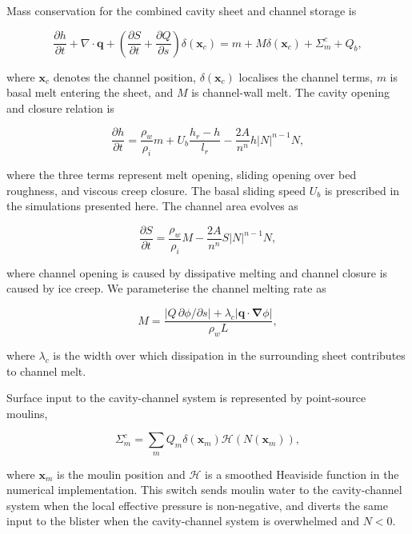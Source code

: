 \documentclass[draft]{agujournal2019}
\newcommand{\Grad}{\boldsymbol{\nabla}}
\newcommand{\pdiff}[2]{\frac{\partial{#1}}{\partial{#2}}}
\begin{document}
Mass conservation for the combined cavity sheet and channel storage is
\begin{linenomath*}
\begin{equation}\label{eq:mass_conservation}
    \pdiff{h}{t}
    + \nabla \cdot \boldsymbol{q}
    + \left(\pdiff{S}{t}+\pdiff{Q}{s}\right)\delta(\boldsymbol{x}_c)
    = m + M\delta(\boldsymbol{x}_c) + \Sigma_m^{c} + Q_b,
\end{equation}
\end{linenomath*}
where $\boldsymbol{x}_c$ denotes the channel position, $\delta(\boldsymbol{x}_c)$ localises the channel terms, $m$ is basal melt entering the sheet, and $M$ is channel-wall melt. The cavity opening and closure relation is
\begin{linenomath*}
\begin{equation}\label{eq:cavity_evolution}
    \pdiff{h}{t}
    =
    \frac{\rho_w}{\rho_i}m
    + U_b\frac{h_r-h}{l_r}
    - \frac{2A}{n^n}h|N|^{n-1}N,
\end{equation}
\end{linenomath*}
where the three terms represent melt opening, sliding opening over bed roughness, and viscous creep closure. The basal sliding speed $U_b$ is prescribed in the simulations presented here. The channel area evolves as
\begin{linenomath*}
\begin{equation}\label{eq:channel_evolution}
    \pdiff{S}{t}
    =
    \frac{\rho_w}{\rho_i}M
    - \frac{2A}{n^n}S|N|^{n-1}N,
\end{equation}
\end{linenomath*}
where channel opening is caused by dissipative melting and channel closure is caused by ice creep. We parameterise the channel melting rate as
\begin{linenomath*}
\begin{equation}\label{eq:channel_melting_method}
    M = \frac{\left|Q\,\partial\phi/\partial s\right|
    + \lambda_c\left|\boldsymbol{q}\cdot\Grad\phi\right|}
    {\rho_w L},
\end{equation}
\end{linenomath*}
where $\lambda_c$ is the width over which dissipation in the surrounding sheet contributes to channel melt.

Surface input to the cavity-channel system is represented by point-source moulins,
\begin{linenomath*}
\begin{equation}\label{eq:moulin_cavity}
    \Sigma_m^{c}
    =
    \sum_m Q_m \delta(\boldsymbol{x}_m)\mathcal{H}\left(N(\boldsymbol{x}_m)\right),
\end{equation}
\end{linenomath*}
where $\boldsymbol{x}_m$ is the moulin position and $\mathcal{H}$ is a smoothed Heaviside function in the numerical implementation. This switch sends moulin water to the cavity-channel system when the local effective pressure is non-negative, and diverts the same input to the blister when the cavity-channel system is overwhelmed and $N<0$.
\end{document}
